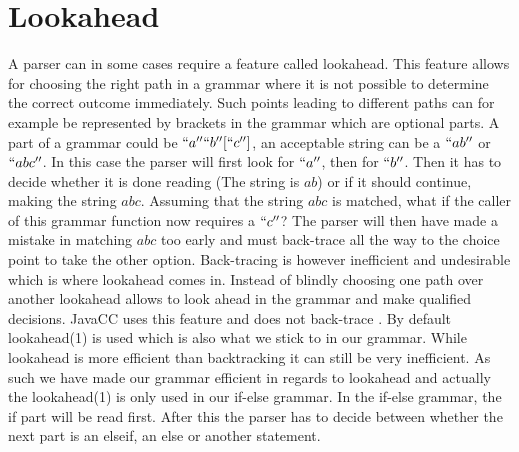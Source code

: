 \section{Lookahead} \label{sec:lookahead}
A parser can in some cases require a feature called lookahead. This feature allows for choosing the right path in a grammar where it is not possible to determine the correct outcome immediately. Such points leading to different paths can for example be represented by brackets in the grammar which are optional parts. 
A part of a grammar could be $``a'' ``b'' [``c'']$, an acceptable string can be a $``ab''$ or $``abc''$. In this case the parser will first look for $``a''$, then for $``b''$. Then it has to decide whether it is done reading (The string is $ab$) or if it should continue, making the string $abc$. Assuming that the string $abc$ is matched, what if the caller of this grammar function now requires a $``c''$? The parser will then have made a mistake in matching $abc$ too early and must back-trace all the way to the choice point to take the other option. 
Back-tracing is however inefficient and undesirable which is where lookahead comes in. Instead of blindly choosing one path over another lookahead allows to look ahead in the grammar and make qualified decisions. JavaCC uses this feature and does not back-trace . By default lookahead(1) is used which is also what we stick to in our grammar. While lookahead is more efficient than backtracking it can still be very inefficient. As such we have made our grammar efficient in regards to lookahead and actually the lookahead(1) is only used in our if-else grammar. In the if-else grammar, the if part will be read first. After this the parser has to decide between whether the next part is an elseif, an else or another statement. 